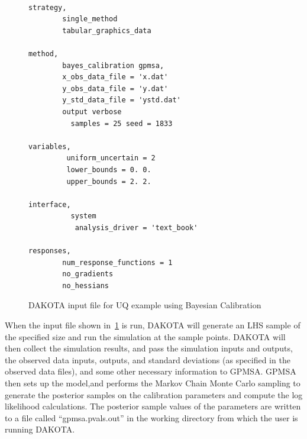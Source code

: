 \begin{figure}
\centering
\begin{bigbox}
\begin{small}
\begin{verbatim}

strategy,
        single_method
        tabular_graphics_data

method,
        bayes_calibration gpmsa,
        x_obs_data_file = 'x.dat'
        y_obs_data_file = 'y.dat'
        y_std_data_file = 'ystd.dat'
        output verbose
          samples = 25 seed = 1833

variables,
         uniform_uncertain = 2
         lower_bounds = 0. 0.
         upper_bounds = 2. 2.

interface,
          system
           analysis_driver = 'text_book'

responses,
        num_response_functions = 1
        no_gradients
        no_hessians
\end{verbatim}
\end{small}
\end{bigbox}
\caption{DAKOTA input file for UQ example using Bayesian Calibration}
\label{uq:figure18}
\end{figure}

When the input file shown in~\ref{uq:figure18} is run, 
DAKOTA will generate an LHS sample of the specified size and run the 
simulation at the sample points.  DAKOTA will then collect the simulation 
results, and pass the simulation inputs and outputs, the observed data 
inputs, outputs, and standard deviations (as specified in the observed 
data files), and some other necessary information 
to GPMSA.  GPMSA then sets up the model,and performs the Markov Chain Monte 
Carlo sampling to generate the posterior samples on the calibration parameters 
and compute the log likelihood calculations. The posterior sample values of 
the parameters are written to a file called ``gpmsa.pvals.out'' in the 
working directory from which the user is running DAKOTA.



